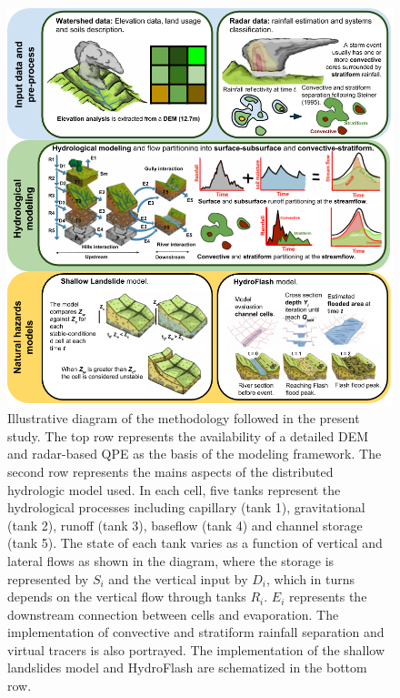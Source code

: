 \documentclass[hess, manuscript]{copernicus}
\begin{document}
\begin{figure}[t]
\centering
 \includegraphics[width=12cm]{Figures/Salgar_Esquema_v2.png}
 \caption{Illustrative diagram of the methodology followed in the present study. The top row represents the availability of a detailed DEM and  radar-based QPE as the basis of the modeling framework. The second row represents the mains aspects of the distributed hydrologic model used. In each cell, five tanks represent the hydrological processes including capillary (tank 1), gravitational (tank 2), runoff (tank 3), baseflow (tank 4) and channel storage (tank 5). The state of each tank varies as a function of vertical and lateral flows as shown in the diagram, where the storage is represented by $S_i$ and the vertical input by $D_i$, which in turns depends on the vertical flow through tanks $R_i$. $E_i$ represents the downstream connection between cells and evaporation. The implementation of convective and stratiform rainfall separation and virtual tracers is also portrayed. The implementation of the shallow landslides model and HydroFlash are schematized in the bottom row.}
    \label{fig:EsquemaMetodologico}
\end{figure}



\end{document}

